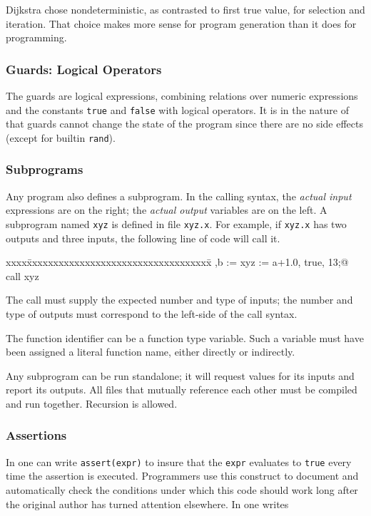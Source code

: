 Dijkstra chose nondeterministic, as contrasted to first true value, 
for selection and iteration.  
That choice makes more sense for program generation than it does for
programming.

\subsubsection{Guards: Logical Operators}

The guards are logical expressions, combining relations over numeric 
expressions and the constants {\tt true} and {\tt false} with logical 
operators.  
It is in the nature of  that guards cannot change the state of 
the program since there are no side effects (except for builtin {\tt rand}).

\subsubsection{Subprograms}

Any program also defines a subprogram.  In the calling syntax, 
the {\em actual input\/} expressions are on the right; 
the {\em actual output\/} variables are on the left.  
A subprogram named {\tt xyz} is defined in file {\tt xyz.x}.  
For example, if {\tt xyz.x} has two outputs and three inputs,
the following line of  code will call it.
\begin{tt}
\begin{tabbing}
xxxx\=xxxxxxxxxxxxxxxxxxxxxxxxxxxxxxxxxxx\=\kill
\>\verb@a,b := xyz := a+1.0, true, 13;@  \>\bq call xyz 
\end{tabbing} 
\end{tt}
\noindent 
The call must supply the expected number and type of inputs; 
the number and type of outputs must correspond to the left-side of the 
call syntax.

The function identifier can be a function type variable.  
Such a variable must have been assigned a literal function name,
either directly or indirectly.

Any subprogram can be run standalone; 
it will request values for its inputs and report its outputs.  
All files that mutually reference each other must be compiled and run 
together.  Recursion is allowed.

\subsubsection{Assertions}

In  one can write {\tt assert(expr)} to insure that the {\tt expr} 
evaluates to {\tt true} every time the assertion is executed.
Programmers use this construct to document and automatically check the 
conditions under which this code should work long after the original 
author has turned attention elsewhere.  In  one writes

